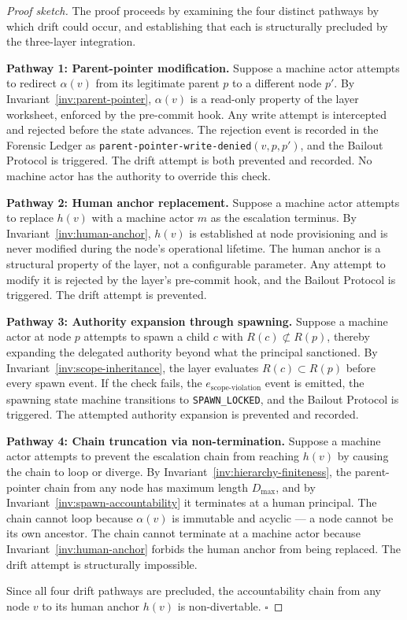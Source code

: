 \begin{proof}[Proof sketch]
The proof proceeds by examining the four distinct pathways by which drift could
occur, and establishing that each is structurally precluded by the three-layer
integration.

\textbf{Pathway 1: Parent-pointer modification.} Suppose a machine actor
attempts to redirect $\alpha(v)$ from its legitimate parent $p$ to a different
node $p'$. By Invariant~\ref{inv:parent-pointer}, $\alpha(v)$ is a read-only
property of the \fact{} layer worksheet, enforced by the pre-commit hook. Any
write attempt is intercepted and rejected before the state advances. The
rejection event is recorded in the Forensic Ledger as
\texttt{parent-pointer-write-denied}$(v, p, p')$, and the Bailout Protocol is
triggered. The drift attempt is both prevented and recorded. No machine actor
has the authority to override this check.

\textbf{Pathway 2: Human anchor replacement.} Suppose a machine actor attempts
to replace $h(v)$ with a machine actor $m$ as the escalation terminus. By
Invariant~\ref{inv:human-anchor}, $h(v)$ is established at node provisioning and
is never modified during the node's operational lifetime. The human anchor is a
structural property of the \purpose{} layer, not a configurable parameter. Any
attempt to modify it is rejected by the \fact{} layer's pre-commit hook, and the
Bailout Protocol is triggered. The drift attempt is prevented.

\textbf{Pathway 3: Authority expansion through spawning.} Suppose a machine
actor at node $p$ attempts to spawn a child $c$ with $R(c) \not\subset R(p)$,
thereby expanding the delegated authority beyond what the principal sanctioned.
By Invariant~\ref{inv:scope-inheritance}, the \bounds{} layer evaluates
$R(c) \subset R(p)$ before every spawn event. If the check fails, the
$e_{\text{scope-violation}}$ event is emitted, the spawning state machine
transitions to \texttt{SPAWN\_LOCKED}, and the Bailout Protocol is triggered.
The attempted authority expansion is prevented and recorded.

\textbf{Pathway 4: Chain truncation via non-termination.} Suppose a machine
actor attempts to prevent the escalation chain from reaching $h(v)$ by causing
the chain to loop or diverge. By Invariant~\ref{inv:hierarchy-finiteness}, the
parent-pointer chain from any node has maximum length $D_{\max}$, and by
Invariant~\ref{inv:spawn-accountability} it terminates at a human principal. The
chain cannot loop because $\alpha(v)$ is immutable and acyclic — a node cannot
be its own ancestor. The chain cannot terminate at a machine actor because
Invariant~\ref{inv:human-anchor} forbids the human anchor from being replaced.
The drift attempt is structurally impossible.

Since all four drift pathways are precluded, the accountability chain from any
node $v$ to its human anchor $h(v)$ is non-divertable. $\square$
\end{proof}

